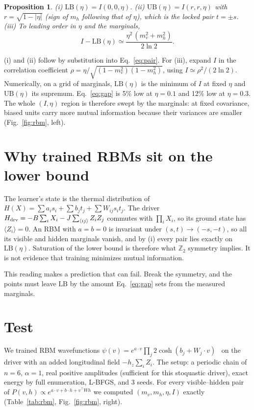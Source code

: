 \documentclass[11pt]{article}
\newtheorem{proposition}{Proposition}
\newcommand{\qv}{m_v}
\newcommand{\qh}{m_h}
\begin{document}
\begin{proposition}
(i) $\mathrm{LB}(\eta)=I(0,0,\eta)$. (ii) $\mathrm{UB}(\eta)=I(r,r,\eta)$ with $r=\sqrt{1-|\eta|}$
(sign of $\qh$ following that of $\eta$), which is the locked pair $t=\pm s$. (iii) To leading order in
$\eta$ and the marginals,
\begin{equation}\label{eq:gap}
I-\mathrm{LB}(\eta)\simeq\frac{\eta^2\,(\qv^2+\qh^2)}{2\ln 2}.
\end{equation}
\end{proposition}
(i) and (ii) follow by substitution into Eq.~\eqref{eq:pair}. For (iii), expand $I$ in the correlation
coefficient $\rho=\eta/\sqrt{(1-\qv^2)(1-\qh^2)}$, using $I\simeq\rho^2/(2\ln2)$. Numerically, on a
grid of marginals, $\mathrm{LB}(\eta)$ is the minimum of $I$ at fixed $\eta$ and $\mathrm{UB}(\eta)$ its
supremum. Eq.~\eqref{eq:gap} is 5\% low at $\eta=0.1$ and 12\% low at $\eta=0.3$. The whole $(I,\eta)$
region is therefore swept by the marginals: at fixed covariance, biased units carry more mutual
information because their variances are smaller (Fig.~\ref{fig:rbm}, left).

\section{Why trained RBMs sit on the lower bound}

The learner's state is the thermal distribution of $H(X)=\sum a_i s_i+\sum b_j t_j+\sum W_{ij}s_it_j$.
The driver $H_{\rm drv}=-B\sum_iX_i-J\sum_{\langle ij\rangle}Z_iZ_j$ commutes with $\prod_iX_i$, so its
ground state has $\langle Z_i\rangle=0$. An RBM with $a=b=0$ is invariant under $(s,t)\to(-s,-t)$, so all
its visible and hidden marginals vanish, and by (i) every pair lies exactly on $\mathrm{LB}(\eta)$.
Saturation of the lower bound is therefore what $\mathbb{Z}_2$ symmetry implies. It is not evidence
that training minimizes mutual information.

This reading makes a prediction that can fail. Break the symmetry, and the points must leave
$\mathrm{LB}$ by the amount Eq.~\eqref{eq:gap} sets from the measured marginals.

\section{Test}

We trained RBM wavefunctions $\psi(v)=e^{a\cdot v}\prod_j2\cosh(b_j+W_j\cdot v)$~\cite{carleo2017} on
the driver with an added longitudinal field $-h_z\sum_iZ_i$. The setup: a periodic chain of $n=6$,
$\alpha=1$, real positive amplitudes (sufficient for this stoquastic driver), exact energy by full
enumeration, L-BFGS, and 3 seeds. For every visible--hidden pair of $P(v,h)\propto e^{a\cdot v+b\cdot
h+v^\top Wh}$ we computed $(\qv,\qh,\eta,I)$ exactly (Table~\ref{tab:rbm}, Fig.~\ref{fig:rbm}, right).
\end{document}
